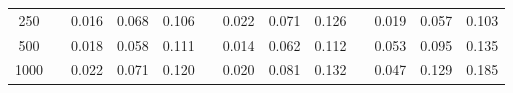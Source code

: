 % 
\begin{tabular}{ccccccccccccc}
  \hline
  \hline
250 &  & 0.016 & 0.068 & 0.106 &  & 0.022 & 0.071 & 0.126 &  & 0.019 & 0.057 & 0.103 \\ 
  500 &  & 0.018 & 0.058 & 0.111 &  & 0.014 & 0.062 & 0.112 &  & 0.053 & 0.095 & 0.135 \\ 
  1000 &  & 0.022 & 0.071 & 0.120 &  & 0.020 & 0.081 & 0.132 &  & 0.047 & 0.129 & 0.185 \\ 
   \hline
\end{tabular}

